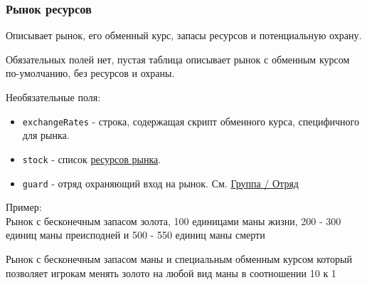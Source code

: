 \subsubsection{Рынок ресурсов}
\label{resourcemarket}
Описывает рынок, его обменный курс, запасы ресурсов и потенциальную охрану.

Обязательных полей нет, пустая таблица описывает рынок с обменным курсом по-умолчанию, без ресурсов и охраны.

Необязательные поля:
\begin{itemize}
\item \texttt{exchangeRates} - строка, содержащая скрипт обменного курса, специфичного для рынка.
\item \texttt{stock} - список \hyperref[marketresource]{ресурсов рынка}.
\item \texttt{guard} - отряд охраняющий вход на рынок. См. \hyperref[group]{Группа / Отряд}
\end{itemize}

Пример:\\
Рынок с бесконечным запасом золота, 100 единицами маны жизни, 200 - 300 единиц маны преисподней и 500 - 550 единиц маны смерти

\begin{figure}[H]

\end{figure}

Рынок с бесконечным запасом маны и специальным обменным курсом который позволяет игрокам менять золото на любой вид маны в соотношении 10 к 1

\begin{figure}[H]

\end{figure}